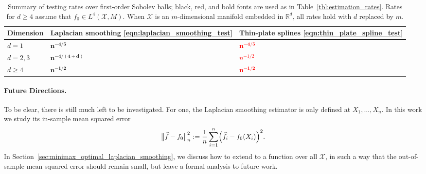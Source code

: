 \documentclass[twoside]{article}
\newcommand{\Reals}{\mathbb{R}}
\newcommand{\1}{\mathbf{1}}
\newcommand{\Rd}{\Reals^d}
\newcommand{\Xset}{\mathcal{X}}
\newcommand{\Leb}{L}
\newcommand{\wh}[1]{\widehat{#1}}
\theoremstyle{definition}
\theoremstyle{remark}
\begin{document}
\begin{table}
	\begin{center}
		\begin{tabular}{p{} | p{} p{} }
			Dimension & Laplacian smoothing \eqref{eqn:laplacian_smoothing_test} & Thin-plate splines \eqref{eqn:thin_plate_spline_test} \\
			\hline
			$d = 1$ & $\bm{n^{-4/5}}$ & \textcolor{red}{$\bm{n^{-4/5}}$} \\
			$d = 2,3$ & $\bm{n^{-4/(4 + d)}}$ & \textcolor{red}{$n^{-1/2}$} \\
			$d \geq 4$ & $\bm{n^{-1/2}}$ & \textcolor{red}{$\bm{n^{-1/2}}$}
		\end{tabular}
	\end{center}
	\caption{Summary of testing rates over first-order Sobolev balls; black, red, and bold fonts are used as in Table~\ref{tbl:estimation_rates}. Rates for $d \geq 4$ assume that $f_0 \in \Leb^4(\Xset,M)$. When $\Xset$ is an $m$-dimensional manifold embedded in $\Rd$, all rates hold with $d$ replaced by $m$.}
	\label{tbl:testing_rates}
\end{table}

\paragraph{Future Directions.} 

To be clear, there is still much left to be investigated. For one, the Laplacian smoothing estimator \smash{$\wh{f}$} is only defined at $X_1,\ldots,X_n$. In this work we study its in-sample mean squared error 
\begin{equation}
\label{eqn:empirical_norm_error}
\bigl\|\wh{f} - f_0\bigr\|_n^2 := \frac{1}{n}\sum_{i = 1}^{n} \Bigl(\wh{f}_i - f_0(X_i)\Bigr)^2.
\end{equation}
In Section~\ref{sec:minimax_optimal_laplacian_smoothing}, we discuss how to extend \smash{$\wh{f}$} to a function over all $\Xset$, in such a way that the out-of-sample mean squared error \smash{$\|\wh{f} - f_0\|_{\Leb^2(\Xset)}^2$} should remain small, but leave a formal analysis to future work.
\end{document}
